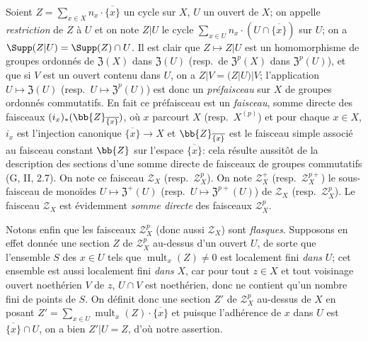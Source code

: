 \begin{env}[21.6.3]
Soient $Z=\sum_{x\in X}n_x\cdot\overline{\{x\}}$ un cycle sur $X$, $U$ un ouvert de $X$;
on appelle \emph{restriction} de $Z$ à $U$ et on note $Z|U$ le cycle $\sum_{x\in U}n_x\cdot(U\cap\overline{\{x\}})$ sur $U$;
on a $\Supp(Z|U)=\Supp(Z)\cap U$.
Il est clair que $Z\mapsto Z|U$ est un homomorphisme de groupes ordonnés de $\mathfrak{Z}(X)$ dans $\mathfrak{Z}(U)$ (resp.\ de $\mathfrak{Z}^p(X)$ dans $\mathfrak{Z}^p(U)$), et que si $V$ est un ouvert contenu dans $U$, on a $Z|V=(Z|U)|V$;
l'application $U\mapsto\mathfrak{Z}(U)$ (resp.\ $U\mapsto\mathfrak{Z}^p(U)$) est donc un \emph{préfaisceau} sur $X$ de groupes ordonnés commutatifs.
En fait ce préfaisceau est un \emph{faisceau}, somme directe des faisceaux $(i_x)_*(\bb{Z}_{\overline{\{x\}}})$, où $x$ parcourt $X$ (resp.\ $X^{(p)}$) et pour chaque $x\in X$, $i_x$ est l'injection canonique $\overline{\{x\}}\to X$ et $\bb{Z}_{\overline{\{x\}}}$ est le faisceau simple associé au faisceau constant $\bb{Z}$ sur l'espace $\overline{\{x\}}$:
cela résulte aussitôt de la description des sections d'une somme directe de faisceaux de groupes commutatifs (G, II, 2.7).
On note ce faisceau $\mathscr{Z}_X$ (resp.\ $\mathscr{Z}_X^p$).
On note $\mathscr{Z}_X^+$ (resp.\ $\mathscr{Z}_X^{p+}$) le sous-faisceau
de monoïdes $U\mapsto\mathfrak{Z}^+(U)$ (resp.\ $U\mapsto\mathfrak{Z}^{p+}(U)$) de $\mathscr{Z}_X$ (resp.\ $\mathscr{Z}_X^p$).
Le faisceau $\mathscr{Z}_X$ est évidemment \emph{somme directe} des faisceaux $\mathscr{Z}_X^p$.

Notons enfin que les faisceaux $\mathscr{Z}_X^p$ (donc aussi $\mathscr{Z}_X$) sont \emph{flasques}.
Supposons en effet donnée une section $Z$ de $\mathscr{Z}_X^p$ au-dessus d'un ouvert $U$, de sorte que l'ensemble $S$ des $x\in U$ tels que $\operatorname{mult}_x(Z)\neq0$ est localement fini \emph{dans} $U$;
cet ensemble est aussi localement fini \emph{dans} $X$, car pour tout $z\in X$ et tout voisinage ouvert noethérien $V$ de $z$, $U\cap V$ est noethérien, donc ne contient qu'un nombre fini de points de $S$.
On définit donc une section $Z'$ de $\mathscr{Z}_X^p$ au-dessus de $X$ en posant $Z'=\sum_{x\in U}\operatorname{mult}_x(Z)\cdot\overline{\{x\}}$ et puisque l'adhérence de $x$ dans $U$ est $\overline{\{x\}}\cap U$, on a bien $Z'|U=Z$, d'où notre assertion.
\end{env}

